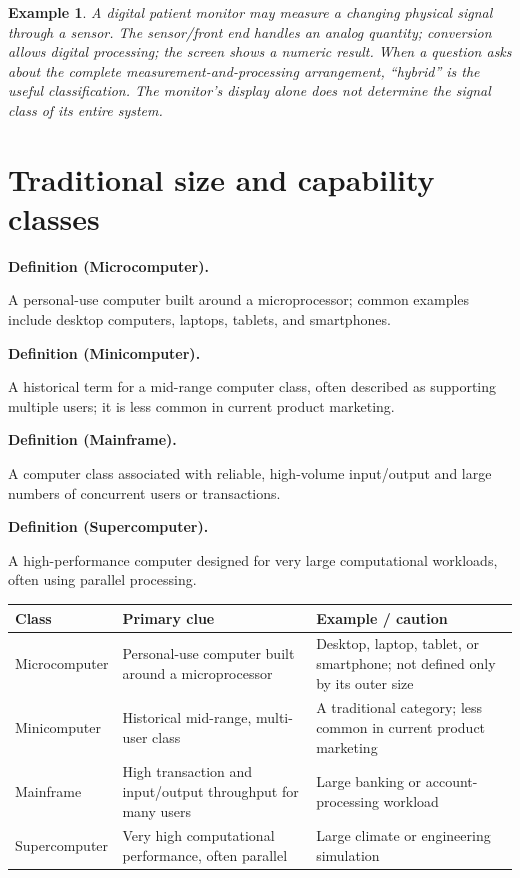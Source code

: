 \documentclass[11pt]{article}
\newtheorem{example}{Example}[section]
\newenvironment{definitionbox}[1]{%
  \par\noindent\textbf{Definition (#1).}\ \itshape
}{\par\vspace{0.3em}}
\begin{document}
\begin{example}
A digital patient monitor may measure a changing physical signal through a
sensor. The sensor/front end handles an analog quantity; conversion allows
digital processing; the screen shows a numeric result. When a question asks
about the complete measurement-and-processing arrangement, ``hybrid'' is
the useful classification. The monitor's display alone does not determine
the signal class of its entire system.
\end{example}

\section{Traditional size and capability classes}
\begin{definitionbox}{Microcomputer}
A personal-use computer built around a microprocessor; common examples
include desktop computers, laptops, tablets, and smartphones.
\end{definitionbox}

\begin{definitionbox}{Minicomputer}
A historical term for a mid-range computer class, often described as
supporting multiple users; it is less common in current product marketing.
\end{definitionbox}

\begin{definitionbox}{Mainframe}
A computer class associated with reliable, high-volume input/output and
large numbers of concurrent users or transactions.
\end{definitionbox}

\begin{definitionbox}{Supercomputer}
A high-performance computer designed for very large computational
workloads, often using parallel processing.
\end{definitionbox}

\begin{center}
\begin{tabular}{p{}p{}p{}}
\toprule
\textbf{Class} & \textbf{Primary clue} & \textbf{Example / caution}\\
\midrule
Microcomputer & Personal-use computer built around a microprocessor & Desktop, laptop, tablet, or smartphone; not defined only by its outer size\\
Minicomputer & Historical mid-range, multi-user class & A traditional category; less common in current product marketing\\
Mainframe & High transaction and input/output throughput for many users & Large banking or account-processing workload\\
Supercomputer & Very high computational performance, often parallel & Large climate or engineering simulation\\
\bottomrule
\end{tabular}
\end{center}
\end{document}
